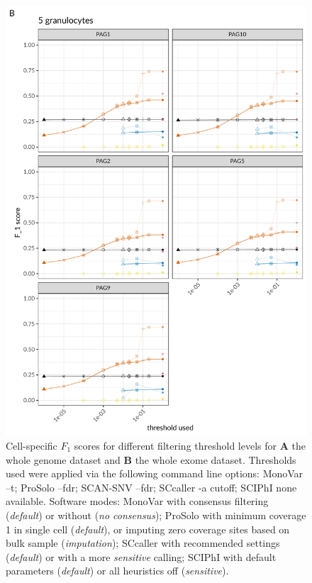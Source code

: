 \documentclass[authoryear,preprint,11pt]{scrartcl}
\begin{document}
\begin{figure}[!tpb]
\begin{minipage}[t]{.35\linewidth}
 \end{minipage}
 \begin{minipage}[t]{.64\linewidth}
 \vspace{0pt}
  \includegraphics[width=\linewidth]{figs/Laehnemann2017/Laehnemann2017_prosolo-monovar-scansnv-sccaller-sciphi_F1_plot.pdf} \newline
 \end{minipage}
 \caption{
 Cell-specific $F_1$ scores for different filtering threshold levels for \textbf{A} the whole genome dataset and \textbf{B} the whole exome dataset.\newline \footnotesize
  Thresholds used were applied via the following command line options:
  MonoVar {\ttfamily --t};
  ProSolo {\ttfamily --fdr};
  SCAN-SNV {\ttfamily --fdr};
  SCcaller {\ttfamily -a cutoff};
  SCIPhI {\ttfamily none available}.
  Software modes:
  MonoVar with consensus filtering ({\itshape default}) or without ({\itshape no consensus});
  ProSolo with minimum coverage 1 in single cell ({\itshape default}), or imputing zero coverage sites based on bulk sample ({\itshape imputation});
  SCcaller with recommended settings ({\itshape default}) or with a more {\itshape sensitive} calling;
  SCIPhI with default parameters ({\itshape default}) or all heuristics off ({\itshape sensitive}).
 }
 \label{fig:F_1-scores}
\end{figure}
\end{document}
